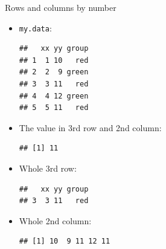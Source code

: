 \begin{frame}[fragile]{Rows and columns by number}
  \begin{multicols}{2}
  \begin{itemize}

    
  \item \texttt{my.data}:
 
\begin{knitrout}
\color{fgcolor}\begin{kframe}
\begin{alltt}
\end{alltt}
\begin{verbatim}
##   xx yy group
## 1  1 10   red
## 2  2  9 green
## 3  3 11   red
## 4  4 12 green
## 5  5 11   red
\end{verbatim}
\end{kframe}
\end{knitrout}
    
  \item The value in 3rd row and 2nd column:
 
\begin{knitrout}
\color{fgcolor}\begin{kframe}
\begin{alltt}
\hlstd{my.data[}\hlstd{,}\hlstd{]}
\end{alltt}
\begin{verbatim}
## [1] 11
\end{verbatim}
\end{kframe}
\end{knitrout}

\item Whole 3rd row:
 
\begin{knitrout}
\color{fgcolor}\begin{kframe}
\begin{alltt}
\hlstd{my.data[}\hlstd{,]}
\end{alltt}
\begin{verbatim}
##   xx yy group
## 3  3 11   red
\end{verbatim}
\end{kframe}
\end{knitrout}

\item Whole 2nd column:
  
 
\begin{knitrout}
\color{fgcolor}\begin{kframe}
\begin{alltt}
\hlstd{my.data[,}\hlstd{]}
\end{alltt}
\begin{verbatim}
## [1] 10  9 11 12 11
\end{verbatim}
\end{kframe}
\end{knitrout}


\end{itemize}
\end{multicols}
\end{frame}
